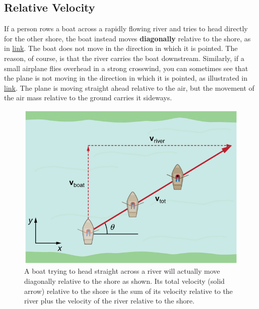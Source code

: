 \documentclass[
]{book}
\begin{document}
\hypertarget{fs-id1629614}{}
\hypertarget{relative-velocity}{%
\subsection{Relative Velocity}\label{relative-velocity}}

If a person rows a boat across a rapidly flowing river and tries to head
directly for the other shore, the boat instead moves \textbf{diagonally}
relative to the shore, as in
\protect\hyperlink{import-auto-id1635451}{link}. The boat does
not move in the direction in which it is pointed. The reason, of course,
is that the river carries the boat downstream. Similarly, if a small
airplane flies overhead in a strong crosswind, you can sometimes see
that the plane is not moving in the direction in which it is pointed, as
illustrated in \protect\hyperlink{import-auto-id1851600}{link}.
The plane is moving straight ahead relative to the air, but the movement
of the air mass relative to the ground carries it sideways.

\begin{figure}
\hypertarget{import-auto-id1635451}{%
\centering
\includegraphics{images/Figure_03_05_01a.jpg}
\caption{A boat trying to head straight across a river will actually move
diagonally relative to the shore as shown. Its total velocity (solid
arrow) relative to the shore is the sum of its velocity relative to the
river plus the velocity of the river relative to the
shore.}\label{import-auto-id1635451}
}
\end{figure}
\end{document}
